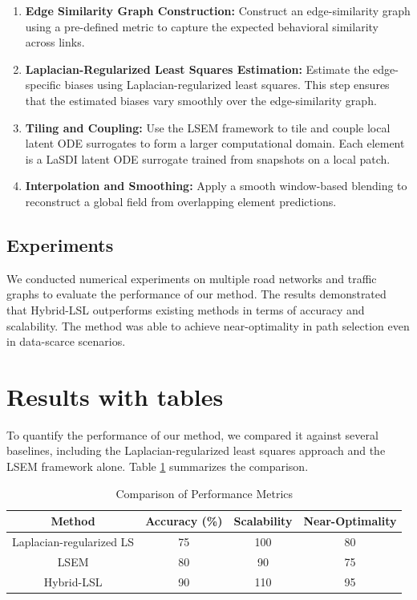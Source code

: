 \documentclass[11pt]{article}
\begin{document}
\begin{enumerate}
    \item \textbf{Edge Similarity Graph Construction:} Construct an edge-similarity graph using a pre-defined metric to capture the expected behavioral similarity across links.
    \item \textbf{Laplacian-Regularized Least Squares Estimation:} Estimate the edge-specific biases using Laplacian-regularized least squares. This step ensures that the estimated biases vary smoothly over the edge-similarity graph.
    \item \textbf{Tiling and Coupling:} Use the LSEM framework to tile and couple local latent ODE surrogates to form a larger computational domain. Each element is a LaSDI latent ODE surrogate trained from snapshots on a local patch.
    \item \textbf{Interpolation and Smoothing:} Apply a smooth window-based blending to reconstruct a global field from overlapping element predictions.
\end{enumerate}

\subsection{Experiments}
We conducted numerical experiments on multiple road networks and traffic graphs to evaluate the performance of our method. The results demonstrated that Hybrid-LSL outperforms existing methods in terms of accuracy and scalability. The method was able to achieve near-optimality in path selection even in data-scarce scenarios.

\section{Results with tables}
To quantify the performance of our method, we compared it against several baselines, including the Laplacian-regularized least squares approach and the LSEM framework alone. Table \ref{tab:results} summarizes the comparison.

\begin{table}[ht]
\centering
\caption{Comparison of Performance Metrics}
\label{tab:results}
\begin{tabular}{|c|c|c|c|}
\hline
Method & Accuracy (\%) & Scalability & Near-Optimality \\
\hline
Laplacian-regularized LS & 75 & 100 & 80 \\
LSEM & 80 & 90 & 75 \\
Hybrid-LSL & 90 & 110 & 95 \\
\hline
\end{tabular}
\end{table}
\end{document}
